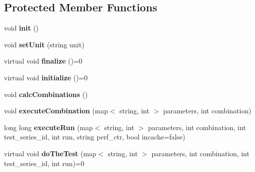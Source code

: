 \subsection*{Protected Member Functions}
\begin{DoxyCompactItemize}
\item 
\hypertarget{classAbstractBenchmark_aff30fa4c4a62faf5cd2ed9ce14e0fbc0}{void {\bfseries init} ()}\label{classAbstractBenchmark_aff30fa4c4a62faf5cd2ed9ce14e0fbc0}

\item 
\hypertarget{classAbstractBenchmark_ac4b495b477e0663ce546413346f45fb9}{void {\bfseries set\-Unit} (string unit)}\label{classAbstractBenchmark_ac4b495b477e0663ce546413346f45fb9}

\item 
\hypertarget{classAbstractBenchmark_ae736c1dac0e2d5273a13f31eb6190e4a}{virtual void {\bfseries finalize} ()=0}\label{classAbstractBenchmark_ae736c1dac0e2d5273a13f31eb6190e4a}

\item 
\hypertarget{classAbstractBenchmark_ab38779e484cb0d4adfc0ef9754387181}{virtual void {\bfseries initialize} ()=0}\label{classAbstractBenchmark_ab38779e484cb0d4adfc0ef9754387181}

\item 
\hypertarget{classAbstractBenchmark_a0e66cdd463c35d894eb3e3292cf9b76f}{void {\bfseries calc\-Combinations} ()}\label{classAbstractBenchmark_a0e66cdd463c35d894eb3e3292cf9b76f}

\item 
\hypertarget{classAbstractBenchmark_a8beeb7cd39efd6ee28be6189b99d0a36}{void {\bfseries execute\-Combination} (map$<$ string, int $>$ parameters, int combination)}\label{classAbstractBenchmark_a8beeb7cd39efd6ee28be6189b99d0a36}

\item 
\hypertarget{classAbstractBenchmark_a6b3ab384ec99cf55580b98cb2ae73518}{long long {\bfseries execute\-Run} (map$<$ string, int $>$ parameters, int combination, int test\-\_\-series\-\_\-id, int run, string perf\-\_\-ctr, bool incache=false)}\label{classAbstractBenchmark_a6b3ab384ec99cf55580b98cb2ae73518}

\item 
\hypertarget{classAbstractBenchmark_ab5e1a1ebe5fd221af785e7b7cefc6b0d}{virtual void {\bfseries do\-The\-Test} (map$<$ string, int $>$ parameters, int combination, int test\-\_\-series\-\_\-id, int run)=0}\label{classAbstractBenchmark_ab5e1a1ebe5fd221af785e7b7cefc6b0d}


\end{DoxyCompactItemize}
